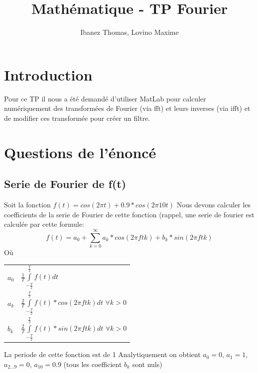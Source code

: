 \documentclass[a4paper,11pt]{article}
\title{Mathématique - TP Fourier}
\author{Ibanez Thomas, Lovino Maxime}
\makeatletter
\newenvironment{conditions}
  {\par\vspace{\abovedisplayskip}\noindent\begin{tabular}{>{$}l<{$} @{${}={}$} l}}
  {\end{tabular}\par\vspace{\belowdisplayskip}}
\makeatother
\begin{document}
\maketitle
\section{Introduction}
Pour ce TP il nous a été demandé d'utiliser MatLab pour calculer numériquement des transformées de Fourier (via fft) et leurs inverses (via ifft) et de modifier ces transformée pour créer un filtre.
\section{Questions de l'énoncé}

\subsection{Serie de Fourier de f(t)}
Soit la fonction $f(t) = cos(2\pi t) + 0.9*cos(2\pi 10t)$ \newline
Nous devons calculer les coefficients de la serie de Fourier de cette fonction (rappel, une serie de fourier est calculée par cette formule: 
\begin{equation*}
f(t) = a_0 + \sum_{k=0}^\infty a_k * cos(2\pi f tk) + b_k * sin(2\pi f tk)
\end{equation*}
Où
\begin{conditions}
a_0 &  $\frac{1}{T} \int\limits_{-\frac{T}{2}}^{\frac{T}{2}}  f(t) dt $ \\
a_k &  $\frac{2}{T} \int\limits_{-\frac{T}{2}}^{\frac{T}{2}} f(t) * cos(2\pi ftk) dt$ $ \forall k > 0$\\
b_k & $\frac{2}{T} \int\limits_{-\frac{T}{2}}^{\frac{T}{2}} f(t) * sin(2\pi ftk) dt$ $ \forall k > 0$
\end{conditions}
La periode de cette fonction est de 1 \newline
Analytiquement on obtient
$a_0 = 0$, $a_1 = 1$, $a_{2...9} = 0$, $a_{10} = 0.9$ (tous les coefficient $b_k$ sont nuls)
\end{document}
